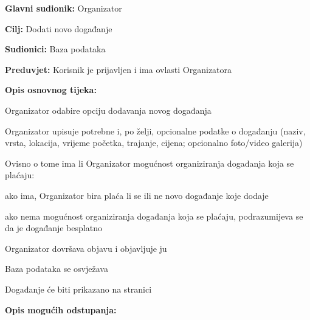 					\noindent {}
					\begin{packed_item}
						
						\item \textbf{Glavni sudionik:} Organizator
						\item  \textbf{Cilj:} Dodati novo događanje 
						\item  \textbf{Sudionici:} Baza podataka
						\item  \textbf{Preduvjet:} Korisnik je prijavljen i ima ovlasti Organizatora
						\item  \textbf{Opis osnovnog tijeka:}
						
						\item[] \begin{packed_enum}
							
							\item Organizator odabire opciju dodavanja novog događanja
							\item Organizator upisuje potrebne i, po želji, opcionalne podatke o događanju (naziv, vrsta, lokacija, vrijeme početka, trajanje, cijena; opcionalno foto/video galerija)
							
							\item Ovisno o tome ima li Organizator mogućnost organiziranja događanja koja se plaćaju: 
							\item[] \begin{packed_enum}
								\item ako ima, Organizator bira plaća li se ili ne novo događanje koje dodaje 
								\item ako nema mogućnost organiziranja događanja koja se plaćaju, podrazumijeva se da je događanje besplatno
							\end{packed_enum}
							
							\item Organizator dovršava objavu i objavljuje ju
							\item Baza podataka se osvježava
							\item Događanje će biti prikazano na stranici
							
							\end{packed_enum}
							
							\item  \textbf{Opis mogućih odstupanja:}
							
							\item[] \begin{packed_item}
								

\end{packed_item}
\end{packed_item}
